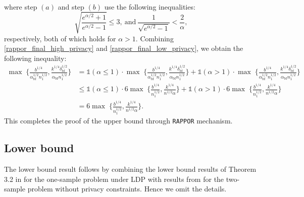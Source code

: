 \documentclass[twoside,11pt]{article}
\newcommand{\normSqMultinomMax}{b}
\newcommand{\alphabetSize}{k} %
\newcommand{\sampleSize}{n}
\newcommand{\privacyParameter}{\alpha} %
\newcommand{\privacyParameterrappor}{\privacyParameter_{\mathrm{bf}}}
\newcommand{\smallNumber}{\delta}
\newcommand{\smallNumberrappor}{\smallNumber_{\mathrm{bf}}}
\begin{document}
\begin{appendix}
\begin{align*}
	\end{align*}
	where step $(a)$ and step $(b)$ use the following inequalities:
	\begin{equation*}
		\sqrt{\frac{e^{\alpha/2}+1}{e^{\alpha/2}-1}}
		\leq 3,~\text{and}~
		\frac{1}{\sqrt{e^{\privacyParameter/2}-1}} < \frac{2}{\privacyParameter}
		,
	\end{equation*}
	respectively, both of which holds for $\privacyParameter>1$.
	Combining \eqref{rappor_final_high_privacy} and \eqref{rappor_final_low_privacy}, we obtain the following inequality:
	\begin{align*}
		\max \;
		\biggl\{
		\frac{
			\normSqMultinomMax^{1/4}
		}{
			\privacyParameterrappor^{1/2}
			\sampleSize_1^{1/2}}
		,
		\frac{
			\alphabetSize^{1/4}
			\smallNumberrappor^{1/2} 
		}{
			\privacyParameterrappor
			\sampleSize_1^{1/2}}
		\biggr\}
		&=
		\mathds{1}(\alpha \leq 1) \cdot
		\max \;
		\biggl\{
		\frac{
			\normSqMultinomMax^{1/4}
		}{
			\privacyParameterrappor^{1/2}
			\sampleSize_1^{1/2}}
		,
		\frac{
			\alphabetSize^{1/4}
			\smallNumberrappor^{1/2} 
		}{
			\privacyParameterrappor
			\sampleSize_1^{1/2}}
		\biggr\}
		+
		\mathds{1}(\alpha > 1) \cdot
		\max \;
		\biggl\{
		\frac{
			\normSqMultinomMax^{1/4}
		}{
			\privacyParameterrappor^{1/2}
			\sampleSize_1^{1/2}}
		,
		\frac{
			\alphabetSize^{1/4}
			\smallNumberrappor^{1/2} 
		}{
			\privacyParameterrappor
			\sampleSize_1^{1/2}}
		\biggr\}
		\\&\leq
		\mathds{1}(\alpha \leq 1) \cdot
		6
		\max \;
		\biggl\{
		\frac{b^{1/4}}{\sampleSize_1^{1/2}},
		\frac{k^{1/4}}{
			n^{1/2}
			\privacyParameter
		}
		\biggr\}
		+
		\mathds{1}(\alpha > 1) \cdot
		6
		\max \;
		\biggl\{
		\frac{b^{1/4}}{\sampleSize_1^{1/2}},
		\frac{k^{1/4}}{
			n^{1/2}
			\privacyParameter
		}
		\biggr\}
		\\&=
		6
		\max \;
		\biggl\{
		\frac{b^{1/4}}{\sampleSize_1^{1/2}},
		\frac{k^{1/4}}{
			n^{1/2}
			\privacyParameter
		}
		\biggr\}.
	\end{align*}
	This completes the proof of the upper bound through \texttt{RAPPOR} mechanism.
	
	
	\subsection{Lower bound}
	The lower bound result follows by combining the lower bound results of Theorem 3.2 in \citep{Lam-Weil2021MinimaxConstraint} for the one-sample problem under LDP with results from \citep{chan2014optimal,kim_minimax_2022} for the two-sample problem without privacy constraints. Hence we omit the details. 
	

\end{appendix}
\end{document}
